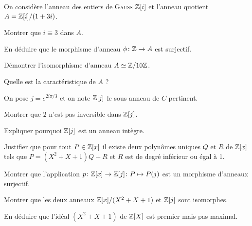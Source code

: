 \documentclass[french]{report}
\begin{document}
\begin{exo}
    On considère l'anneau des entiers de \textsc{Gauss} \(\mathbb{Z}[i]\) et l'anneau quotient
    \(A = \mathbb{Z}[i]/(1+3i)\).
    \begin{q}{1}
        Montrer que \(i\equiv 3\) dans \(A\).
    \end{q}
    \begin{q}{2}
        En déduire que le morphisme d'anneau \(\phi\colon \mathbb{Z}\to A\) est surjectif.
    \end{q}
    \begin{q}{3}
        Démontrer l'isomorphisme d'anneau \(A\simeq \mathbb{Z}/10\mathbb{Z}\).
    \end{q}
    \begin{q}{4}
        Quelle est la caractéristique de \(A\) ?
    \end{q}
\end{exo}

\begin{exo}
    On pose \(j=e^{2i\pi/3}\) et on note \(\mathbb{Z}[j]\) le sous anneau de \(C\) pertinent.
    \begin{q}{1}
        Montrer que \(2\) n'est pas inversible dans \(\mathbb{Z}[j]\).
    \end{q}
    \begin{q}{2}
        Expliquer pourquoi \(\mathbb{Z}[j]\) est un anneau intègre.
    \end{q}
    \begin{q}{3}
        Justifier que pour tout \(P\in\mathbb{Z}[x]\) il existe deux polynômes uniques \(Q\) et \(R\)
        de \(\mathbb{Z}[x]\) tels que \(P=(X^2+X+1)Q+R\) et \(R\) est de degré inférieur ou égal à 1.
    \end{q}
    \begin{q}{4}
        Montrer que l'application \(p\colon\mathbb{Z}[x]\to\mathbb{Z}[j]\colon P\mapsto P(j)\) est un
        morphisme d'anneaux surjectif.
    \end{q}
    \begin{q}{5}
        Montrer que les deux anneaux \(\mathbb{Z}[x]/(X^2+X+1)\) et \(\mathbb{Z}[j]\) sont isomorphes.
    \end{q}
    \begin{q}{6}
        En déduire que l'idéal \((X^2+X+1)\) de \(\mathbb{Z}[X]\) est premier mais pas maximal.
    \end{q}
\end{exo}
\end{document}
